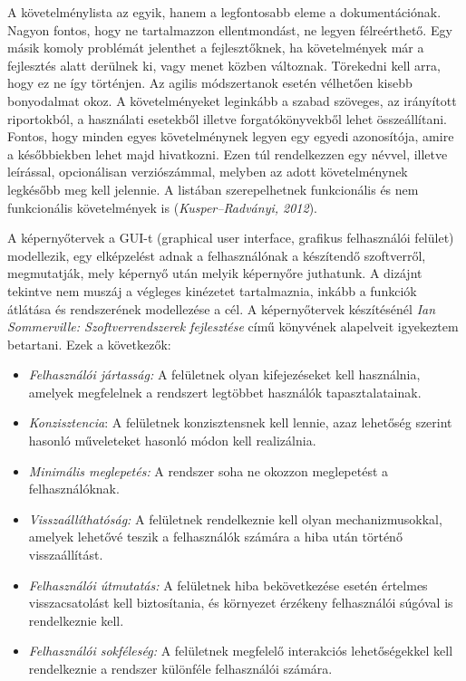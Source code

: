 \documentclass[12pt]{article}
\begin{document}
A követelménylista az egyik, hanem a legfontosabb eleme a dokumentációnak.  Nagyon fontos, hogy ne tartalmazzon ellentmondást, ne legyen félreérthető. Egy másik komoly problémát jelenthet a fejlesztőknek, ha követelmények már a fejlesztés alatt derülnek ki, vagy menet közben változnak. Törekedni kell arra, hogy ez ne így történjen. Az agilis módszertanok esetén vélhetően kisebb bonyodalmat okoz.
A követelményeket leginkább a szabad szöveges, az irányított riportokból, a használati esetekből illetve forgatókönyvekből lehet összeállítani. Fontos, hogy minden egyes követelménynek legyen egy egyedi azonosítója, amire a későbbiekben lehet majd hivatkozni. Ezen túl rendelkezzen egy névvel, illetve leírással, opcionálisan verziószámmal, melyben az adott követelménynek legkésőbb meg kell jelennie. A listában szerepelhetnek funkcionális és nem funkcionális követelmények is (\textit{Kusper–Radványi, 2012}).

A képernyőtervek a GUI-t (graphical user interface, grafikus felhasználói felület) modellezik, egy elképzelést adnak a felhasználónak a készítendő szoftverről, megmutatják, mely képernyő után melyik képernyőre juthatunk. A dizájnt tekintve nem muszáj a végleges kinézetet tartalmaznia, inkább a funkciók átlátása és rendszerének modellezése a cél. A képernyőtervek készítésénél \textit{Ian Sommerville: Szoftverrendszerek fejlesztése} című könyvének alapelveit igyekeztem betartani. Ezek a következők:

\begin{itemize}

\item \textit{Felhasználói jártasság:} A felületnek olyan kifejezéseket kell használnia, amelyek megfelelnek 
a rendszert legtöbbet használók tapasztalatainak.

\item  \textit{Konzisztencia}: A felületnek konzisztensnek kell lennie, azaz lehetőség szerint hasonló 
műveleteket hasonló módon kell realizálnia.
\item  \textit{Minimális meglepetés:}  A rendszer soha ne okozzon meglepetést a felhasználóknak.
\item  \textit{Visszaállíthatóság:} A felületnek rendelkeznie kell olyan mechanizmusokkal, amelyek lehetővé 
teszik a felhasználók számára a hiba után történő visszaállítást.

\item  \textit{Felhasználói útmutatás:} A felületnek hiba bekövetkezése esetén értelmes visszacsatolást kell 
biztosítania, és környezet érzékeny felhasználói súgóval is rendelkeznie kell.

\item  \textit{Felhasználói sokféleség:} A felületnek megfelelő interakciós lehetőségekkel kell rendelkeznie a 
rendszer különféle felhasználói számára.
\end{itemize}
\end{document}
